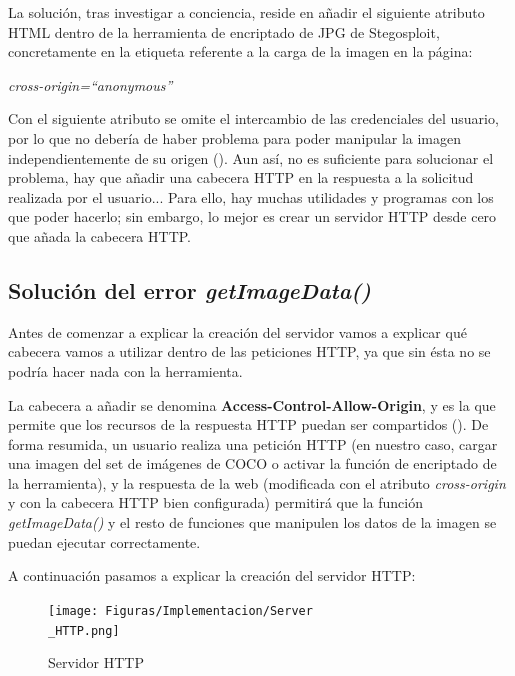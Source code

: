 La solución, tras investigar a conciencia, reside en añadir el siguiente atributo HTML dentro de la herramienta de encriptado de JPG de Stegosploit, concretamente en la etiqueta referente a la carga de la imagen en la página:

\begin{center}
\textit{cross-origin=``anonymous''}
\end{center}

Con el siguiente atributo se omite el intercambio de las credenciales del usuario, por lo que no debería de haber problema para poder manipular la imagen independientemente de su origen (\cite{cross-origin-anonymous}). Aun así, no es suficiente para solucionar el problema, hay que añadir una cabecera HTTP en la respuesta a la solicitud realizada por el usuario... Para ello, hay muchas utilidades y programas con los que poder hacerlo; sin embargo, lo mejor es crear un servidor HTTP desde cero que añada la cabecera HTTP. %

\subsection{Solución del error \textit{getImageData()}}

Antes de comenzar a explicar la creación del servidor vamos a explicar qué cabecera vamos a utilizar dentro de las peticiones HTTP, ya que sin ésta no se podría hacer nada con la herramienta.

La cabecera a añadir se denomina \textbf{Access-Control-Allow-Origin}, y es la que permite que los recursos de la respuesta HTTP puedan ser compartidos (\cite{access-control-allow-origin}). De forma resumida, un usuario realiza una petición HTTP (en nuestro caso, cargar una imagen del set de imágenes de COCO o activar la función de encriptado de la herramienta), y la respuesta de la web (modificada con el atributo \textit{cross-origin} y con la cabecera HTTP bien configurada) permitirá que la función \textit{getImageData()} y el resto de funciones que manipulen los datos de la imagen se puedan ejecutar correctamente. %

A continuación pasamos a explicar la creación del servidor HTTP:

\begin{figure}[H]
  \centering
  \texttt{[image: Figuras/Implementacion/Server\\\_HTTP.png]}
  \label{fig:server-http}
  \caption{Servidor HTTP}
\end{figure}

